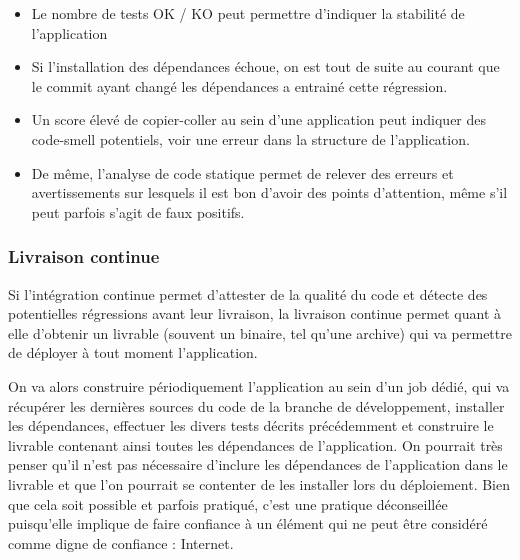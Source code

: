 \begin{itemize}
	\setlength\itemsep{0em}
	\item Le nombre de tests OK / KO peut permettre d'indiquer la stabilité de l'application
	\item Si l'installation des dépendances échoue, on est tout de suite au courant que le commit ayant changé les dépendances a entrainé cette régression.
	\item Un score élevé de copier-coller au sein d'une application peut indiquer des \gls{code-smell} potentiels, voir une erreur dans la structure de l'application.
	\item De même, l'analyse de code statique permet de relever des erreurs et avertissements sur lesquels il est bon d'avoir des points d'attention, même s'il peut parfois s'agit de faux positifs.
\end{itemize}

\subsubsection{Livraison continue}

Si l'intégration continue permet d'attester de la qualité du code et détecte des potentielles régressions avant leur livraison, la livraison continue permet quant à elle d'obtenir un livrable (souvent un binaire, tel qu'une archive) qui va permettre de déployer à tout moment l'application. 

On va alors construire périodiquement l'application au sein d'un job dédié, qui va récupérer les dernières sources du code de la branche de développement, installer les dépendances, effectuer les divers tests décrits précédemment et construire le livrable contenant ainsi toutes les dépendances de l'application. On pourrait très penser qu'il n'est pas nécessaire d'inclure les dépendances de l'application dans le livrable et que l'on pourrait se contenter de les installer lors du déploiement. Bien que cela soit possible et parfois pratiqué, c'est une pratique déconseillée puisqu'elle implique de faire confiance à un élément qui ne peut être considéré comme digne de confiance : Internet. 

